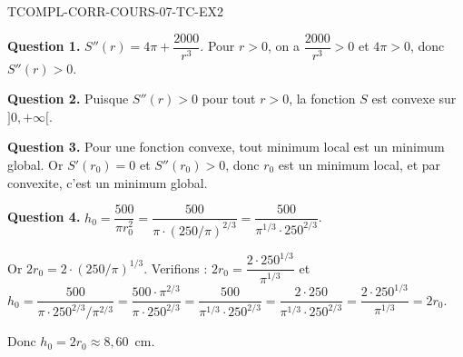 \begin{corrige}{TCOMPL-CORR-COURS-07-TC-EX2}

\textbf{Question 1.} $S''(r) = 4\pi + \dfrac{2000}{r^3}$. Pour $r > 0$, on a $\dfrac{2000}{r^3} > 0$ et $4\pi > 0$, donc $S''(r) > 0$.

\textbf{Question 2.} Puisque $S''(r) > 0$ pour tout $r > 0$, la fonction $S$ est convexe sur $]0, +\infty[$.

\textbf{Question 3.} Pour une fonction convexe, tout minimum local est un minimum global. Or $S'(r_0) = 0$ et $S''(r_0) > 0$, donc $r_0$ est un minimum local, et par convexite, c'est un minimum global.

\textbf{Question 4.} $h_0 = \dfrac{500}{\pi r_0^2} = \dfrac{500}{\pi \cdot (250/\pi)^{2/3}} = \dfrac{500}{\pi^{1/3} \cdot 250^{2/3}}$.

Or $2r_0 = 2 \cdot (250/\pi)^{1/3}$. Verifions : $2r_0 = \dfrac{2 \cdot 250^{1/3}}{\pi^{1/3}}$ et $h_0 = \dfrac{500}{\pi \cdot 250^{2/3}/\pi^{2/3}} = \dfrac{500 \cdot \pi^{2/3}}{\pi \cdot 250^{2/3}} = \dfrac{500}{\pi^{1/3} \cdot 250^{2/3}} = \dfrac{2 \cdot 250}{\pi^{1/3} \cdot 250^{2/3}} = \dfrac{2 \cdot 250^{1/3}}{\pi^{1/3}} = 2r_0$.

Donc $h_0 = 2r_0 \approx 8{,}60$~cm.

\end{corrige}
